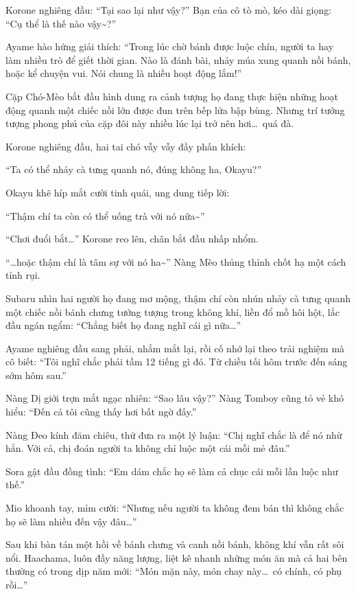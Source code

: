 \documentclass[../main.tex]{subfiles}
\begin{document}
Korone nghiêng đầu: ``Tại sao lại như vậy?'' Bạn của cô tò mò, kéo dài giọng: ``Cụ thể là thế nào vậy\~{}?''

Ayame hào hứng giải thích: ``Trong lúc chờ bánh được luộc chín, người ta hay làm nhiều trò để giết thời gian. Nào là đánh bài, nhảy múa xung quanh nồi bánh, hoặc kể chuyện vui. Nói chung là nhiều hoạt động lắm!''

Cặp Chó-Mèo bắt đầu hình dung ra cảnh tượng họ đang thực hiện những hoạt động quanh một chiếc nồi lớn được đun trên bếp lửa bập bùng. Nhưng trí tưởng tượng phong phú của cặp đôi này nhiều lúc lại trở nên hơi\dots\ quá đà.

Korone nghiêng đầu, hai tai chó vẫy vẫy đầy phấn khích:

``Ta có thể nhảy cà tưng quanh nó, đúng không ha, Okayu?''

Okayu khẽ híp mắt cười tinh quái, ung dung tiếp lời:

``Thậm chí ta còn có thể uống trà với nó nữa\~{}''

``Chơi đuổi bắt\dots'' Korone reo lên, chân bắt đầu nhấp nhổm.

``\dots hoặc thậm chí là tâm sự với nó ha\~{}'' Nàng Mèo thủng thỉnh chốt hạ một cách tỉnh rụi.

Subaru nhìn hai người họ đang mơ mộng, thậm chí còn nhún nhảy cà tưng quanh một chiếc nồi bánh chưng tưởng tượng trong không khí, liền đổ mồ hôi hột, lắc đầu ngán ngẩm: ``Chẳng biết họ đang nghĩ cái gì nữa\dots''

Ayame nghiêng đầu sang phải, nhắm mắt lại, rồi cố nhớ lại theo trải nghiệm mà cô biết: ``Tôi nghĩ chắc phải tầm 12 tiếng gì đó. Từ chiều tối hôm trước đến sáng sớm hôm sau.''

Nàng Dị giới trợn mắt ngạc nhiên: ``Sao lâu vậy?'' Nàng Tomboy cũng tỏ vẻ khó hiểu: ``Đến cả tôi cũng thấy hơi bất ngờ đấy.''

Nàng Đeo kính đăm chiêu, thử đưa ra một lý luận: ``Chị nghĩ chắc là để nó nhừ hẳn. Với cả, chị đoán người ta không chỉ luộc một cái mỗi mẻ đâu.''

Sora gật đầu đồng tình: ``Em dám chắc họ sẽ làm cả chục cái mỗi lần luộc như thế.''

Mio khoanh tay, mỉm cười: ``Nhưng nếu người ta không đem bán thì không chắc họ sẽ làm nhiều đến vậy đâu\dots''

Sau khi bàn tán một hồi về bánh chưng và canh nồi bánh, không khí vẫn rất sôi nổi. Haachama, luôn đầy năng lượng, liệt kê nhanh những món ăn mà cả hai bên thường có trong dịp năm mới: ``Món mặn này, món chay này\dots\ có chính, có phụ rồi\dots''
\end{document}
